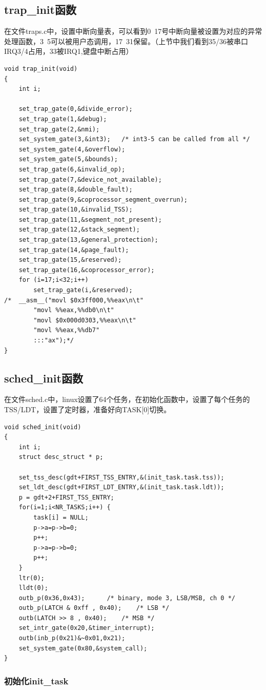 \documentclass[12pt]{article}
\begin{document}
\subsection{trap\_init函数}	
在文件traps.c中，设置中断向量表，可以看到0~17号中断向量被设置为对应的异常处理函数，3~5可以被用户态调用，17~31保留。（上节中我们看到35/36被串口IRQ3/4占用，33被IRQ1,键盘中断占用）
\begin{lstlisting}[breaklines]
void trap_init(void)
{
	int i;

	set_trap_gate(0,&divide_error);
	set_trap_gate(1,&debug);
	set_trap_gate(2,&nmi);
	set_system_gate(3,&int3);	/* int3-5 can be called from all */
	set_system_gate(4,&overflow);
	set_system_gate(5,&bounds);
	set_trap_gate(6,&invalid_op);
	set_trap_gate(7,&device_not_available);
	set_trap_gate(8,&double_fault);
	set_trap_gate(9,&coprocessor_segment_overrun);
	set_trap_gate(10,&invalid_TSS);
	set_trap_gate(11,&segment_not_present);
	set_trap_gate(12,&stack_segment);
	set_trap_gate(13,&general_protection);
	set_trap_gate(14,&page_fault);
	set_trap_gate(15,&reserved);
	set_trap_gate(16,&coprocessor_error);
	for (i=17;i<32;i++)
		set_trap_gate(i,&reserved);
/*	__asm__("movl $0x3ff000,%%eax\n\t"
		"movl %%eax,%%db0\n\t"
		"movl $0x000d0303,%%eax\n\t"
		"movl %%eax,%%db7"
		:::"ax");*/
}
\end{lstlisting}
\subsection{sched\_init函数}	
在文件sched.c中，linux设置了64个任务，在初始化函数中，设置了每个任务的TSS/LDT，设置了定时器，准备好向TASK[0]切换。

\begin{lstlisting}[breaklines]
void sched_init(void)
{
	int i;
	struct desc_struct * p;

	set_tss_desc(gdt+FIRST_TSS_ENTRY,&(init_task.task.tss));
	set_ldt_desc(gdt+FIRST_LDT_ENTRY,&(init_task.task.ldt));
	p = gdt+2+FIRST_TSS_ENTRY;
	for(i=1;i<NR_TASKS;i++) {
		task[i] = NULL;
		p->a=p->b=0;
		p++;
		p->a=p->b=0;
		p++;
	}
	ltr(0);
	lldt(0);
	outb_p(0x36,0x43);		/* binary, mode 3, LSB/MSB, ch 0 */
	outb_p(LATCH & 0xff , 0x40);	/* LSB */
	outb(LATCH >> 8 , 0x40);	/* MSB */
	set_intr_gate(0x20,&timer_interrupt);
	outb(inb_p(0x21)&~0x01,0x21);
	set_system_gate(0x80,&system_call);
}
\end{lstlisting}
\subsubsection{初始化init\_task}
\end{document}
